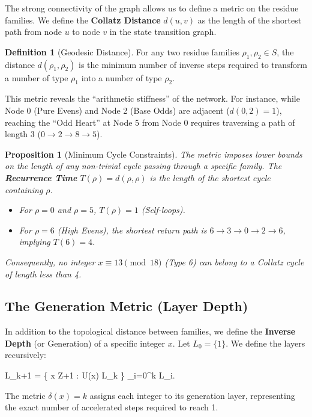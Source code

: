 \documentclass[11pt,letterpaper]{amsart}
\def\mathbb#1{#1}%
\def\[{ }%
\def\]{ }%
\theoremstyle{definition}
\newtheorem{definition}{Definition}
\theoremstyle{plain}
\newtheorem{proposition}{Proposition}
\theoremstyle{plain}
\theoremstyle{remark}
\begin{document}
The strong connectivity of the graph allows us to define a metric on the residue families. We define the \textbf{Collatz Distance} $d(u, v)$ as the length of the shortest path from node $u$ to node $v$ in the state transition graph.

\begin{definition}[Geodesic Distance]
For any two residue families $\rho_1, \rho_2 \in S$, the distance $d(\rho_1, \rho_2)$ is the minimum number of inverse steps required to transform a number of type $\rho_1$ into a number of type $\rho_2$.
\end{definition}

This metric reveals the ``arithmetic stiffness'' of the network. For instance, while Node 0 (Pure Evens) and Node 2 (Base Odds) are adjacent ($d(0,2)=1$), reaching the ``Odd Heart'' at Node 5 from Node 0 requires traversing a path of length 3 ($0 \to 2 \to 8 \to 5$).

\begin{proposition}[Minimum Cycle Constraints]
The metric imposes lower bounds on the length of any non-trivial cycle passing through a specific family. The \textbf{Recurrence Time} $T(\rho) = d(\rho, \rho)$ is the length of the shortest cycle containing $\rho$.
\begin{itemize}
    \item For $\rho=0$ and $\rho=5$, $T(\rho)=1$ (Self-loops).
    \item For $\rho=6$ (High Evens), the shortest return path is $6 \to 3 \to 0 \to 2 \to 6$, implying $T(6)=4$.
\end{itemize}
Consequently, no integer $x \equiv 13 \pmod{18}$ (Type 6) can belong to a Collatz cycle of length less than 4.
\end{proposition}

\subsection{The Generation Metric (Layer Depth)}

In addition to the topological distance between families, we define the \textbf{Inverse Depth} (or Generation) of a specific integer $x$. Let $L_0 = \{1\}$. We define the layers recursively:
\[
L_{k+1} \;=\; \{ x \mathbb{Z}+1 : U(x) \in L_k \} \setminus \bigcup_{i=0}^k L_i.
\]
The metric $\delta(x) = k$ assigns each integer to its generation layer, representing the exact number of accelerated steps required to reach 1.
\end{document}
